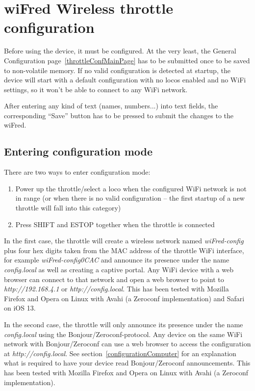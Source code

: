 \documentclass[11pt,a4paper]{scrartcl}
\begin{document}
\clearpage

\section{wiFred Wireless throttle configuration} \label{config}

Before using the device, it must be configured. At the very least, the General Configuration page~\ref{throttleConfMainPage} has to be submitted once to be saved to non-volatile memory. If no valid configuration is detected at startup, the device will start with a default configuration with no locos enabled and no WiFi settings, so it won't be able to connect to any WiFi network.

After entering any kind of text (names, numbers...) into text fields, the corresponding ``Save'' button has to be pressed to submit the changes to the wiFred.

\subsection{Entering configuration mode}

There are two ways to enter configuration mode:

\begin{enumerate}
\item Power up the throttle/select a loco when the configured WiFi network is not in range (or when there is no valid configuration -- the first startup of a new throttle will fall into this category)
\item Press SHIFT and ESTOP together when the throttle is connected
\end{enumerate}

In the first case, the throttle will create a wireless network named \textit{wiFred-config} plus four hex digits taken from the MAC address of the throttle WiFi interface, for example \textit{wiFred-config0CAC} and announce its presence under the name \textit{config.local} as well as creating a captive portal. Any WiFi device with a web browser can connect to that network and open a web browser to point to \textit{http://192.168.4.1} or \textit{http://config.local}. This has been tested with Mozilla Firefox and Opera on Linux with Avahi (a Zeroconf implementation) and Safari on iOS 13.

In the second case, the throttle will only announce its presence under the name \textit{config.local} using the Bonjour/Zeroconf-protocol. Any device on the same WiFi network with Bonjour/Zeroconf can use a web browser to access the configuration at \textit{http://config.local}. See section~\ref{configurationComputer} for an explanation what is required to have your device read Bonjour/Zeroconf announcements. This has been tested with Mozilla Firefox and Opera on Linux with Avahi (a Zeroconf implementation).
\end{document}
